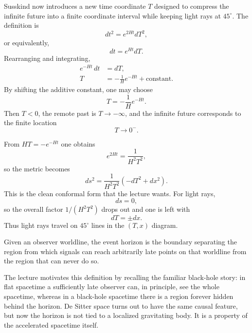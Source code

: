 Susskind now introduces a new time coordinate \(T\) designed to compress the infinite future into a finite coordinate interval while keeping light rays at \(45^\circ\). The definition is
\begin{equation}
dt^2=e^{2Ht}dT^2,
\end{equation}
or equivalently,
\begin{equation}
dt=e^{Ht}dT.
\end{equation}
Rearranging and integrating,
\begin{align}
e^{-Ht}\,dt&=dT,\\
T&=-\frac{1}{H}e^{-Ht}+ \text{constant}.
\end{align}
By shifting the additive constant, one may choose
\begin{equation}
T=-\frac{1}{H}e^{-Ht}.
\end{equation}
Then \(T<0\), the remote past is \(T\to -\infty\), and the infinite future corresponds to the finite location
\begin{equation}
T\to 0^{-}.
\end{equation}

From \(HT=-e^{-Ht}\) one obtains
\begin{equation}
e^{2Ht}=\frac{1}{H^2T^2},
\end{equation}
so the metric becomes
\begin{equation}
ds^2=\frac{1}{H^2T^2}\left(-dT^2+dx^2\right).
\end{equation}
This is the clean conformal form that the lecture wants. For light rays,
\begin{equation}
ds=0,
\end{equation}
so the overall factor \(1/(H^2T^2)\) drops out and one is left with
\begin{equation}
dT=\pm dx.
\end{equation}
Thus light rays travel on \(45^\circ\) lines in the \((T,x)\) diagram.

\begin{definition}
Given an observer worldline, the event horizon is the boundary separating the region from which signals can reach arbitrarily late points on that worldline from the region that can never do so.
\end{definition}

The lecture motivates this definition by recalling the familiar black-hole story: in flat spacetime a sufficiently late observer can, in principle, see the whole spacetime, whereas in a black-hole spacetime there is a region forever hidden behind the horizon. De Sitter space turns out to have the same causal feature, but now the horizon is not tied to a localized gravitating body. It is a property of the accelerated spacetime itself.

